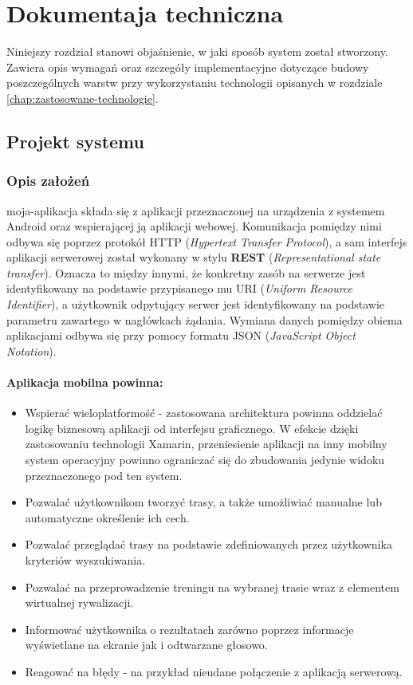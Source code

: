 \chapter{Dokumentaja techniczna}\label{chap:dokumentacja-techniczna}
Niniejszy rozdział stanowi objaśnienie, w jaki sposób system został stworzony. Zawiera opis wymagań oraz szczegóły implementacyjne dotyczące budowy poszczególnych warstw przy wykorzystaniu technologii opisanych w rozdziale \ref{chap:zastosowane-technologie}.
\section{Projekt systemu}
\subsection{Opis założeń}
moja-aplikacja składa się z aplikacji przeznaczonej na urządzenia z systemem Android \cite{android} oraz wspierającej ją aplikacji webowej. Komunikacja pomiędzy nimi odbywa się poprzez protokół HTTP (\textit{Hypertext Transfer Protocol}), a sam interfejs aplikacji serwerowej został wykonany w stylu \textbf{REST} (\textit{Representational state transfer}). Oznacza to między innymi, że konkretny zasób na serwerze jest identyfikowany na podstawie przypisanego mu URI (\textit{Uniform Resource Identifier}), a użytkownik odpytujący serwer jest identyfikowany na podstawie parametru zawartego w nagłówkach żądania. Wymiana danych pomiędzy obiema aplikacjami odbywa się przy pomocy formatu JSON (\textit{JavaScript Object Notation}). \cite{ksiazka-asp-core}

\subsubsection{Aplikacja mobilna powinna:}
\begin{itemize}
\item{Wspierać wieloplatformość} - zastosowana architektura powinna oddzielać logikę biznesową aplikacji od interfejsu graficznego. W efekcie dzięki zastosowaniu technologii Xamarin, przeniesienie aplikacji na inny mobilny system operacyjny powinno ograniczać się do zbudowania jedynie widoku przeznaczonego pod ten system.
\item{Pozwalać użytkownikom tworzyć trasy, a także umożliwiać manualne lub automatyczne określenie ich cech.}
\item{Pozwalać przeglądać trasy na podstawie zdefiniowanych przez użytkownika kryteriów wyszukiwania.}
\item{Pozwalać na przeprowadzenie treningu na wybranej trasie wraz z elementem wirtualnej rywalizacji.}
\item{Informować użytkownika o rezultatach zarówno poprzez informacje wyświetlane na ekranie jak i odtwarzane głosowo.}
\item{Reagować na błędy - na przykład nieudane połączenie z aplikacją serwerową.}
\end{itemize}

